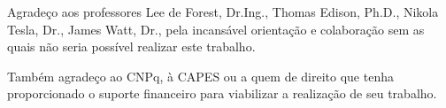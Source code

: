 
\noindent%
Agradeço aos professores Lee de Forest, Dr.Ing., Thomas Edison,
Ph.D., Nikola Tesla, Dr., James Watt, Dr., pela incansável orientação e colaboração sem as quais não seria possível realizar este trabalho.

\noindent%
Também agradeço ao CNPq, à CAPES ou a quem de direito que tenha proporcionado o suporte financeiro para viabilizar a realização de seu trabalho.

\noindent%
\lipsum[2-4]
